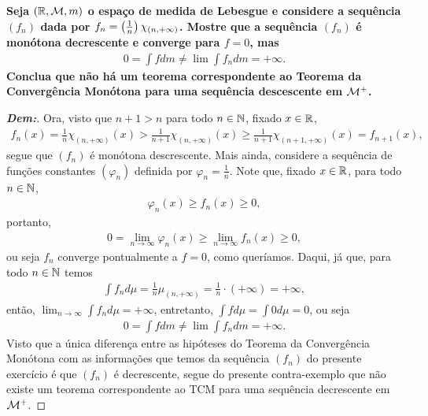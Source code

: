 \biglinend
\newpage
{}
\myexe{\thetres}
\bigline
\textbf{Seja $\left(\mathbb R, \mathcal M, m\right)$ o espaço de medida de Lebesgue e considere a 
sequência $(f_n)$ dada por $f_n = \left(\frac{1}{n}\right)\chi_{(n, +\infty)}$. Mostre que 
a sequência $(f_n)$ é monótona decrescente e converge para $f=0$, mas 
\begin{align*}
  0 = \int f dm \neq \lim \int f_n dm = +\infty.
\end{align*}
Conclua que não há um teorema correspondente ao Teorema da Convergência 
Monótona para uma sequência descescente em $\mathcal M^+$.
}
\begin{proof}[\textbf{Dem:}]
Ora, visto que $n+1 > n$ para todo $n \in \mathbb N$, fixado $x \in \mathbb R$, 
\begin{align*}
  f_n(x) = \frac{1}{n} \chi_{(n, +\infty)}(x) > \frac{1}{n+1} \chi_{(n, +\infty)}(x) \ge
  \frac{1}{n+1} \chi_{(n+1, +\infty)}(x) =f_{n+1}(x),
\end{align*}
  segue que $(f_n)$ é monótona descrescente. Mais ainda, considere a 
  sequência de funções constantes $(\varphi_n)$ definida por $\varphi_n = \frac{1}{n}$. Note que, 
  fixado $x \in \mathbb R$, 
  para todo $n \in \mathbb N$, 
  \begin{align*}
    \varphi_n(x) \ge f_n(x) \ge 0,
  \end{align*}
  portanto, 
  \begin{align*}
    0 = \lim_{n \rightarrow \infty} \varphi_n(x) \ge \lim_{n \rightarrow \infty} f_n(x) \ge 0,
  \end{align*}
  ou seja $f_n$ converge pontualmente a $f=0$, como queríamos. Daqui, já que, 
  para todo $n \in \mathbb N$ temos
  \begin{align*}
    \int f_n d\mu = \frac{1}{n} \mu_{(n, +\infty)} = \frac{1}{n}\cdot(+\infty) = +\infty,
  \end{align*}
  então, $\lim_{n \rightarrow \infty} \int f_n d\mu = +\infty$, entretanto, 
  $\int f d\mu = \int 0 d\mu = 0$, ou seja 
  \begin{align*}
   0 = \int f dm \neq \lim \int f_n dm = +\infty.
  \end{align*}
  Visto que a única diferença entre as hipóteses do Teorema da Convergência Monótona 
  com as informações que temos da sequência $(f_n)$ do presente exercício é que 
  $(f_n)$ é decrescente, segue do presente contra-exemplo que não existe um 
  teorema correspondente ao TCM para uma sequência decrescente em $\mathcal M^+$.
\end{proof}
\biglinend
\newpage
{}
\myexe{\thetres}
\bigline
